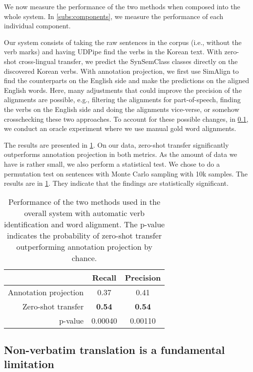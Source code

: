 We now measure the performance of the two methods when composed into the whole system. In \cref{subs:components}, we measure the performance of each individual component.

Our system consists of taking the raw sentences in the corpus (i.e., without the verb marks) and having UDPipe find the verbs in the Korean text. With zero-shot cross-lingual transfer, we predict the SynSemClass classes directly on the discovered Korean verbs. With annotation projection, we first use SimAlign to find the counterparts on the English side and make the predictions on the aligned English words. Here, many adjustments that could improve the precision of the alignments are possible, e.g., filtering the alignments for part-of-speech, finding the verbs on the English side and doing the alignments vice-verse, or somehow crosschecking these two approaches. To account for these possible changes, in \cref{subs:word_align}, we conduct an oracle experiment where we use manual gold word alignments.

The results are presented in \cref{table:system_results}. On our data, zero-shot transfer significantly outperforms annotation projection in both metrics. As the amount of data we have is rather small, we also perform a statistical test. We chose to do a permutation test on sentences with Monte Carlo sampling with 10k samples. The results are in \cref{table:system_results}. They indicate that the findings are statistically significant.

\begin{table}
\centering
\begin{tabular}{rcc} 
  & Recall & Precision  \\
 \hline
 Annotation projection & 0.37 &  0.41 \\ 
 Zero-shot transfer &  \textbf{0.54} & \textbf{0.54} \\
 \hline
 p-value & 0.00040 & 0.00110
\end{tabular}
\caption{Performance of the two methods used in the overall system with automatic verb identification and word alignment. The p-value indicates the probability of zero-shot transfer outperforming annotation projection by chance.}
\label{table:system_results}
\end{table}

\subsection{Non-verbatim translation is a fundamental limitation}
\label{subs:word_align}

